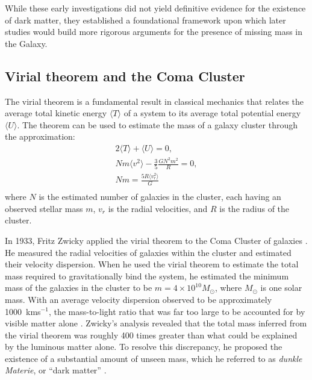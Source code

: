 While these early investigations did not yield definitive evidence for the existence of dark matter, they established a foundational framework upon which later studies would build more rigorous arguments for the presence of missing mass in the Galaxy.

\subsection{Virial theorem and the Coma Cluster}\label{sec:DMOverview/ViralTheorem}
The virial theorem is a fundamental result in classical mechanics that relates the average total kinetic energy $\langle T \rangle$ of a system to its average total potential energy $\langle U \rangle$. The theorem can be used to estimate the mass of a galaxy cluster through the approximation:
\begin{equation}
\begin{split}
2\langle T \rangle + \langle U \rangle = 0, \\
Nm\langle v^2\rangle - \frac{3}{5}\frac{GN^2m^2}{R}=0,\\
Nm=\frac{5R\langle v_r^2 \rangle}{G}\\
\end{split}
\label{eq:DMOverview/virial}
\end{equation}
where $N$ is the estimated number of galaxies in the cluster, each having an observed stellar mass $m$, $v_r$ is the radial velocities, and $R$ is the radius of the cluster.

In 1933, Fritz Zwicky applied the virial theorem to the Coma Cluster of galaxies \cite{Zwicky1933}. He measured the radial velocities of galaxies within the cluster and estimated their velocity dispersion. When he used the virial theorem to estimate the total mass required to gravitationally bind the system, he estimated the minimum mass of the galaxies in the cluster to be $m=4\times 10^{10}M_{\odot}$, where $M_{\odot}$ is one solar mass. With an average velocity dispersion observed to be approximately 1000~kms$^{-1}$, the mass-to-light ratio that was far too large to be accounted for by visible matter alone \cite{HistoryofDM}. Zwicky’s analysis revealed that the total mass inferred from the virial theorem was roughly 400 times greater than what could be explained by the luminous matter alone. To resolve this discrepancy, he proposed the existence of a substantial amount of unseen mass, which he referred to as \textit{dunkle Materie}, or “dark matter” \cite{Zwicky1933}.

